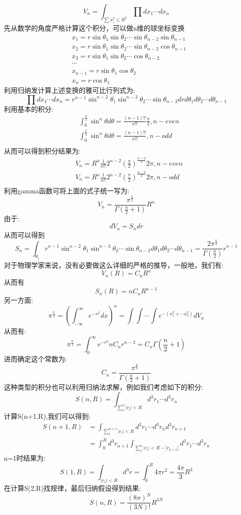 \begin{equation}
V_n=\int_{\sum x_i^2\leq R^2} \prod dx_1\cdots dx_n
\end{equation}
先从数学的角度严格计算这个积分，可以做n维的球坐标变换
\begin{align*}
&x_1=r\sin\theta_1\sin\theta_2\cdots \sin\theta_{n-2}\sin\theta_{n-1}\\
&x_2=r\sin\theta_1\sin\theta_2\cdots \sin\theta_{n-2}\cos\theta_{n-1}\\
&x_3=r\sin\theta_1\sin\theta_2\cdots \cos\theta_{n-2}\\
&\cdots\\
&x_{n-1}=r\sin\theta_1\cos\theta_2\\
&x_{n}=r\cos\theta_1
\end{align*}
利用归纳发计算上述变换的雅可比行列式为:
\[\prod dx_1\cdots dx_n=r^{n-1}\sin^{n-2}\theta_1\sin^{n-3}\theta_2\cdots \sin\theta_{n-2} drd\theta_1 d\theta_2\cdots d\theta_{n-1}\]
利用基本的积分:
\begin{align*}
&\int_{0}^{\frac{\pi}{2}} \sin^n\theta d\theta=\frac{(n-1)!!}{n!!}\frac{\pi}{2}, n-even\\
&\int_{0}^{\frac{\pi}{2}} \sin^n\theta d\theta=\frac{(n-1)!!}{n!!}, n-odd\\
\end{align*}
从而可以得到积分结果为:
\begin{align*}
&V_n=R^n\frac{1}{n!!}2^{n-2}(\frac{\pi}{2})^{\frac{n-2}{2}} 2\pi , n-even\\
&V_n=R^n\frac{1}{n!!}2^{n-2}(\frac{\pi}{2})^{\frac{n-3}{2}} 2\pi , n-odd\\
\end{align*}
利用gamma函数可将上面的式子统一写为:
\[V_n=\frac{\pi^{\frac{n}{2}}}{\Gamma(\frac{n}{2}+1)}R^n\]
由于:
\[dV_n=S_{n}dr\]
从而可以得到
\[S_{n}=\int_{\theta_j}r^{n-1}\sin^{n-2}\theta_1\sin^{n-3}\theta_2\cdots \sin\theta_{n-2} d\theta_1 d\theta_2\cdots d\theta_{n-1}=\frac{2\pi^{\frac{n}{2}}}{\Gamma(\frac{n}{2})}r^{n-1}\]
对于物理学家来说，没有必要做这么详细的严格的推导，一般地，我们有:
\[V_n(R)=C_nR^n\]
从而有
\[S_n(R)=nC_nR^{n-1}\]
另一方面:
\[\pi^{\frac{n}{2}}=(\int_{-\infty}^{\infty}e^{-x^2}dx)^n=\int\int\cdots\int e^{-(x_1^2+\cdots x_n^2)}dV_n\]
从而有:
\[\pi^{\frac{n}{2}}=\int_0^\infty e^{-r^2}nC_n r^{n-2}=C_n\Gamma(\frac{n}{2}+1)\]
进而确定这个常数为:
\[C_n=\frac{\pi^{\frac{n}{2}}}{\Gamma(\frac{n}{2}+1)}\]
这种类型的积分也可以利用归纳法求解，例如我们考虑如下的积分:
\[S(n,R)=\int_{\sum_{1}^n |r_i|<R}d^3r_1\cdots d^3r_n\]
计算S(n+1,R),我们可以得到:
\begin{align*}
S(n+1,R)&=\int_{\sum_{1}^{n+1} |r_i|<R}d^3r_1\cdots d^3r_nd^3r_{n+1}\\
&=\int_0^Rd^3r_{n+1} \int_{\sum_{1}^n |r_i|<R-|r_{n+1}|}d^3r_1\cdots d^3r_n
\end{align*}
n=1时结果为:
\[S(1,R)=\int_{|r_1|<R}d^3r=\int_0^R 4\pi r^2=\frac{4\pi}{3}R^3\]
在计算S(2,R)找规律，最后归纳假设得到结果:
\[S(n,R)=\frac{(8\pi)^N}{(3N)!}R^{3N}\]
